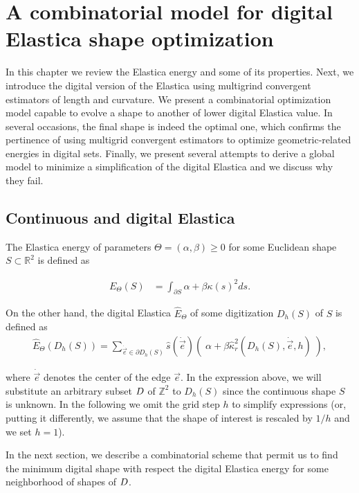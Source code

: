 \chapter{A combinatorial model for digital Elastica shape optimization}
\label{chapter:digital-elastica}

In this chapter we review the Elastica energy and some of its properties. Next, we introduce the digital version of the Elastica using multigrind convergent estimators of length and curvature. We present a combinatorial optimization model capable to evolve a shape to another of lower digital Elastica value. In several occasions, the final shape is indeed the optimal one, which confirms the pertinence of using multigrid convergent estimators to optimize geometric-related energies in digital sets. Finally, we present several attempts to derive a global model to minimize a simplification of the digital Elastica and we discuss why they fail.

\section{Continuous and digital Elastica}
\label{ch6:sec:continuous-digital-elastica}

	The Elastica energy of parameters $\Theta=(\alpha, \beta) \geq 0$ for some Euclidean shape $S \subset \mathbb{R}^2$ is defined as
	
	\begin{align*}
	E_{\Theta}(S) &= \int_{\partial S}{ \alpha + \beta \kappa(s)^2 ds}.
	\end{align*}
	
	
On the other hand, the digital Elastica $\hat{E}_{\Theta}$ of some digitization $D_h(S)$ of $S$ is defined as
	\begin{align}
	\hat{E}_{\Theta}( D_h(S) ) = \sum_{\dot{\vec{e}} \in \partial D_h(S)}{ \hat{s}( \dot{\vec{e}})\left(\; \alpha + \beta \hat{\kappa}_{r}^2(D_h(S),\dot{\vec{e}},h) \; \right)},
	\label{eq:digital-elastica}
	\end{align}
	
where $\dot{\vec{e}}$ denotes the center of the edge $\vec{e}$. In the
expression above, we will substitute an arbitrary subset $D$ of
$\mathbb{Z}^2$ to $D_h(S)$ since the continuous shape $S$ is unknown.
In the following we omit the grid step $h$ to simplify expressions
(or, putting it differently, we assume that the shape of interest is
rescaled by $1/h$ and we set $h=1$). 

In the next section, we describe a combinatorial scheme that permit us to find the minimum digital shape with respect the digital Elastica energy for some neighborhood of shapes of $D$. 

